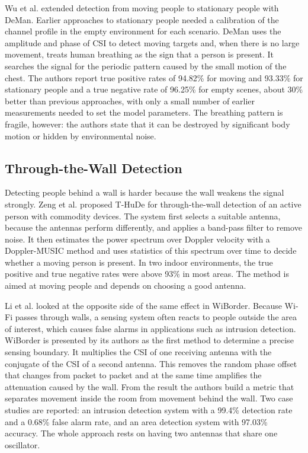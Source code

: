 Wu et al. \cite{deman} extended detection from moving people to stationary people with DeMan. Earlier approaches to stationary people needed a calibration of the channel profile in the empty environment for each scenario. DeMan uses the amplitude and phase of CSI to detect moving targets and, when there is no large movement, treats human breathing as the sign that a person is present. It searches the signal for the periodic pattern caused by the small motion of the chest. The authors report true positive rates of 94.82\% for moving and 93.33\% for stationary people and a true negative rate of 96.25\% for empty scenes, about 30\% better than previous approaches, with only a small number of earlier measurements needed to set the model parameters. The breathing pattern is fragile, however: the authors state that it can be destroyed by significant body motion or hidden by environmental noise.

\subsection{Through-the-Wall Detection}
Detecting people behind a wall is harder because the wall weakens the signal strongly. Zeng et al. \cite{thude} proposed T-HuDe for through-the-wall detection of an active person with commodity devices. The system first selects a suitable antenna, because the antennas perform differently, and applies a band-pass filter to remove noise. It then estimates the power spectrum over Doppler velocity with a Doppler-MUSIC method and uses statistics of this spectrum over time to decide whether a moving person is present. In two indoor environments, the true positive and true negative rates were above 93\% in most areas. The method is aimed at moving people and depends on choosing a good antenna.

Li et al. \cite{wiborder} looked at the opposite side of the same effect in WiBorder. Because Wi-Fi passes through walls, a sensing system often reacts to people outside the area of interest, which causes false alarms in applications such as intrusion detection. WiBorder is presented by its authors as the first method to determine a precise sensing boundary. It multiplies the CSI of one receiving antenna with the conjugate of the CSI of a second antenna. This removes the random phase offset that changes from packet to packet and at the same time amplifies the attenuation caused by the wall. From the result the authors build a metric that separates movement inside the room from movement behind the wall. Two case studies are reported: an intrusion detection system with a 99.4\% detection rate and a 0.68\% false alarm rate, and an area detection system with 97.03\% accuracy. The whole approach rests on having two antennas that share one oscillator.

